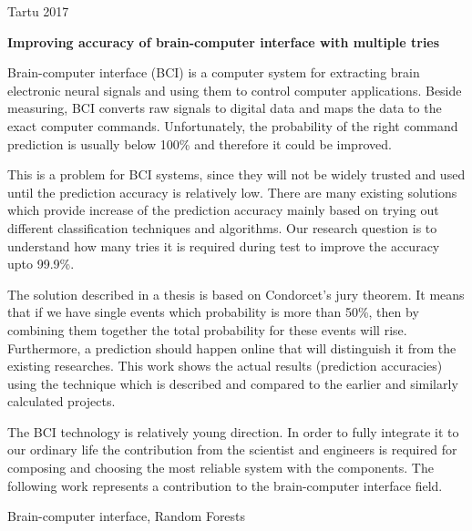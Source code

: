 \documentclass[12pt]{article}
\begin{document}
\vfill
\centerline{Tartu 2017}



\newpage
{}
\noindent\textbf{\large Improving accuracy of brain-computer interface with multiple tries}
\vspace*{2ex}
{ }

Brain-computer interface (BCI) is a computer system for extracting brain electronic neural signals and using them to control computer applications. Beside measuring, BCI converts raw signals to digital data and maps the data to the exact computer commands. Unfortunately, the probability of the right command prediction is usually below 100\% and therefore it could be improved.

This is a problem for BCI systems, since they will not be widely trusted and used until the prediction accuracy is relatively low. There are many existing solutions which provide increase of the prediction accuracy mainly based on trying out different classification techniques and algorithms. Our research question is to understand how many tries it is required during test to improve the accuracy upto 99.9\%.

The solution described in a thesis is based on Condorcet's jury theorem. It means that if we have single events which probability is more than 50\%, then by combining them together the total probability for these events will rise. Furthermore, a prediction should happen online that will distinguish it from the existing researches. This work shows the actual results (prediction accuracies) using the technique which is described and compared to the earlier and similarly calculated projects.

The BCI technology is relatively young direction. In order to fully integrate it to our ordinary life the contribution from the scientist and engineers is required for composing and choosing the most reliable system with the components. The following work represents a contribution to the brain-computer interface field.


\vspace*{3ex}
{}
Brain-computer interface, Random Forests
\vspace*{3ex}
\end{document}
